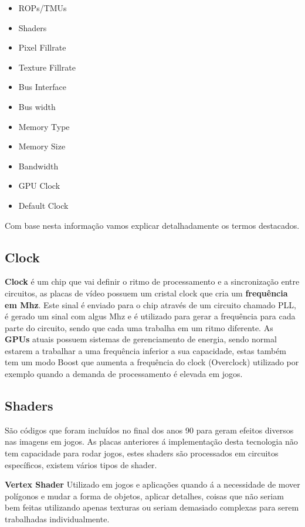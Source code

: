 \documentclass{report}
\begin{document}
\begin{itemize}
    \item ROPs/TMUs
    \item Shaders
    \item Pixel Fillrate
    \item Texture Fillrate
    \item Bus Interface
    \item Bus width
    \item Memory Type
    \item Memory Size
    \item Bandwidth
    \item GPU Clock
    \item Default Clock    
\end{itemize}

Com base nesta informação vamos explicar detalhadamente os termos destacados.

\subsection{Clock}
\label{sect.Clock}
\textbf{Clock} é um chip que vai definir o ritmo de processamento e a sincronização entre circuitos, as placas de vídeo possuem um cristal clock que cria um \textbf{frequência em Mhz}. Este sinal é enviado para o chip através de um circuito chamado \ac{PLL}, é gerado um sinal com algus Mhz e é utilizado para gerar a frequência para cada parte do circuito, sendo que cada uma trabalha em um ritmo diferente. As \textbf{GPUs} atuais possuem sistemas de gerenciamento de energia, sendo normal estarem a trabalhar a uma frequência inferior a sua capacidade, estas também tem um modo Boost que aumenta a frequência do clock (Overclock) utilizado por exemplo quando a demanda de processamento é elevada em jogos.

\subsection{Shaders}
\label{sect.Shaders}

São códigos que foram incluídos no final dos anos 90 para geram efeitos diversos nas imagens em jogos. As placas anteriores á implementação desta tecnologia não tem capacidade para rodar jogos, estes shaders são processados em circuitos específicos, existem vários tipos de shader.

\textbf{Vertex Shader} Utilizado em jogos e aplicações quando á a necessidade de mover polígonos e mudar a forma de objetos, aplicar detalhes, coisas que não seriam bem feitas utilizando apenas texturas ou seriam demasiado complexas para serem trabalhadas individualmente.
\end{document}
